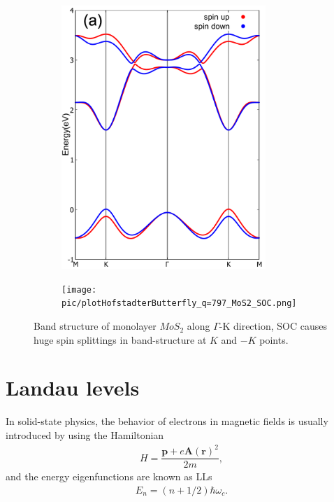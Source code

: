 \documentclass{report}
\newcommand{\f}[2]{\dfrac{#1}{#2}}
\begin{document}
\begin{figure}[htb]
	\begin{subfigure}[b]{0.495\textwidth}
		\centering
		\includegraphics[width=0.85\textwidth,height=1.2\linewidth]{pic/bandstructureSOC.pdf}
	\end{subfigure}
	\begin{subfigure}[b]{0.495\textwidth}
		\centering
		\texttt{[image: pic/plotHofstadterButterfly\_q=797\_MoS2\_SOC.png]}
	\end{subfigure}
	\caption{Band structure of monolayer $MoS_{2}$ along $\Gamma$-K direction, SOC causes huge spin splittings in band-structure at $K$ and $-K$ points.}
\end{figure}




\newpage
\section{Landau levels}
In solid-state physics, the behavior of electrons in magnetic fields is usually introduced by using the Hamiltonian
\begin{gather}
	H = \f{\mathbf{p} + e \mathbf{A}(\mathbf{r})^{2}}{2m} ,
\end{gather}
and the energy eigenfunctions are known as \ac{LLs}
\begin{gather}
	E_{n} = \left(n + 1/2\right) \hbar \omega_{c}.
\end{gather}
\end{document}
